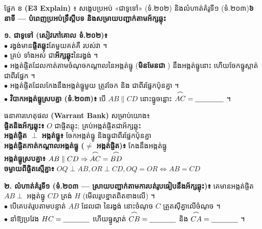 \documentclass[a4paper,10pt]{article}
\newcommand{\en}[1]{{\TimesEn #1}}
\newcommand{\enbf}[1]{{\TimesEn\bfseries #1}}
\newcommand{\cnum}[1]{\mbox{\fontsize{10pt}{12pt}\selectfont\ding{\numexpr181+#1\relax}}}
\newcommand{\arc}[1]{\ensuremath{\overset{\tikz[baseline=-0.55ex]\draw[black, line width=0.55pt] (0,0) to[bend left=40] (1.8ex,0);}{#1}}}
\newcommand{\blank}[1]{\underline{\hspace{#1}}}
\newcommand{\secbox}[2]{%
  \begin{tcolorbox}[
    enhanced, sharp corners, colback=headgray, colframe=black,
    boxrule=0.95pt, boxsep=1pt, top=2.5pt, bottom=2.5pt, left=6pt, right=6pt,
    before skip=4.5pt, after skip=3.5pt
  ]
    {\muol\fontsize{9.4pt}{13.5pt}\selectfont #1}\hfill{\fontsize{8.4pt}{11.5pt}\selectfont\textbf{#2}}
  \end{tcolorbox}%
}
\begin{document}
\secbox{ផ្នែក ខ \enbf{(E3 Explain)} ៖ សង្ខេបប្រអប់ «ជាទូទៅ» (ទំ.២០២) និងលំហាត់គំរូទី១ (ទំ.២០៣)}{៦ នាទី \en{---} បំពេញប្រអប់ទ្រឹស្ដីបទ និងសម្រាយបញ្ជាក់តាមអ័ក្សឆ្លុះ}

\begin{minipage}[t]{10.3cm}
  \vspace{2pt}
  \textbf{១. ជាទូទៅ (សៀវភៅគោល ទំ.២០២)៖}\\[3pt]
  $\bullet$ រង្វង់មាន\textbf{ផ្ចិតឆ្លុះ}តែមួយគត់គឺ \blank{2.4cm} របស់វា ។\\[3pt]
  $\bullet$ គ្រប់ \blank{2.6cm} ទាំងអស់ ជា\textbf{អ័ក្សឆ្លុះ}នៃរង្វង់ ។\\[3pt]
  $\bullet$ អង្កត់ផ្ចិតដែលកាត់តាមចំណុចកណ្ដាលនៃអង្កត់ធ្នូ (\textbf{មិនមែនជា} \blank{2.1cm}) \blank{1.7cm} នឹងអង្កត់ធ្នូនោះ ហើយចែកធ្នូស្កាត់ជាពីរផ្នែក \blank{1.7cm} ។\\[3pt]
  $\bullet$ អង្កត់ផ្ចិតដែលកែងនឹងអង្កត់ធ្នូមួយ ត្រូវចែក \blank{1.9cm} និង \blank{1.5cm} ជាពីរផ្នែកប៉ុនគ្នា ។\\[3pt]
  $\bullet$ \textbf{វិបាកអង្កត់ធ្នូស្របគ្នា (ទំ.២០៣)៖} បើ $AB \parallel CD$ នោះធ្នូចន្លោះ $\arc{AC} = \blank{1.4cm}$ ។
\end{minipage}\hfill%
\begin{minipage}[t]{8.3cm}
  \vspace{0pt}
  \begin{tcolorbox}[
    enhanced, sharp corners, colback=panelgray, colframe=black,
    boxrule=0.85pt, boxsep=2pt, top=3pt, bottom=3pt, left=5pt, right=5pt
  ]
    {\muol\fontsize{8.8pt}{12.5pt}\selectfont ធនាគារហេតុផល \enbf{(Warrant Bank)} សម្រាប់យោង៖}\\[3pt]
    {\fontsize{8.6pt}{13.2pt}\selectfont
    \cnum{1} \textbf{ផ្ចិតនិងអ័ក្សឆ្លុះ៖} $O$ ជាផ្ចិតឆ្លុះ; គ្រប់អង្កត់ផ្ចិតជាអ័ក្សឆ្លុះ\\
    \cnum{2} \textbf{អង្កត់ផ្ចិត $\perp$ អង្កត់ធ្នូ៖} ចែកអង្កត់ធ្នូ និងធ្នូជាពីរផ្នែកប៉ុនគ្នា\\
    \cnum{3} \textbf{អង្កត់ផ្ចិតកាត់កណ្ដាលអង្កត់ធ្នូ ($\ne$ អង្កត់ផ្ចិត)៖} កែងនឹងអង្កត់ធ្នូ\\
    \cnum{4} \textbf{អង្កត់ធ្នូស្របគ្នា៖} $AB \parallel CD \Rightarrow \arc{AC} = \arc{BD}$\\
    \cnum{5} \textbf{ចម្ងាយពីផ្ចិតស្មើគ្នា៖} $OQ\perp AB, OR\perp CD, OQ=OR \iff AB=CD$}
  \end{tcolorbox}
\end{minipage}

\vspace{4pt}
\begin{tcolorbox}[
  enhanced, sharp corners, colback=white, colframe=black,
  boxrule=0.85pt, boxsep=2pt, top=3pt, bottom=3pt, left=6pt, right=6pt
]
  \textbf{២. លំហាត់គំរូទី១ (ទំ.២០៣ — ស្រាយបញ្ជាក់តាមការបត់រូបធៀបនឹងអ័ក្សឆ្លុះ)៖} គេមានអង្កត់ផ្ចិត $AB \perp$ អង្កត់ធ្នូ $CD$ ត្រង់ $H$ (មើលរូបខ្នាតពិតខាងលើ) ។\\[2.5pt]
  $\bullet$ បើគេបត់រូបតាមបន្ទាត់ $AB$ ដែលជា \blank{2.2cm} នៃរង្វង់ នោះចំណុច $C$ ត្រួតស៊ីគ្នាលើចំណុច \blank{1.0cm} ។\\[2.5pt]
  $\bullet$ នាំឱ្យប្រវែង $HC = \blank{1.3cm}$ ហើយធ្នូស្កាត់ $\arc{CB} = \blank{1.3cm}$ និង $\arc{CA} = \blank{1.3cm}$ ។
\end{tcolorbox}
\end{document}
